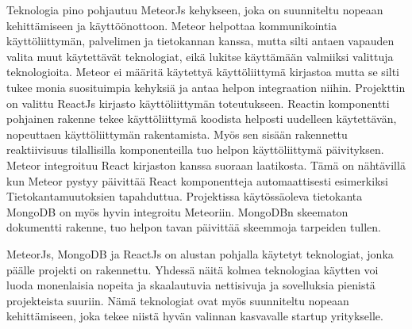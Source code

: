 \documentclass[11pt,a4paper,titlepage,oneside]{article}
\begin{document}
Teknologia pino pohjautuu MeteorJs kehykseen, joka on suunniteltu nopeaan kehittämiseen ja käyttöönottoon.
Meteor helpottaa kommunikointia käyttöliittymän, palvelimen ja tietokannan kanssa, 
mutta silti antaen vapauden valita muut käytettävät teknologiat, eikä lukitse käyttämään valmiiksi valittuja teknologioita.
Meteor ei määritä käytettyä käyttöliittymä kirjastoa mutta se silti tukee monia suosituimpia kehyksiä ja antaa helpon integraation niihin.
Projekttin on valittu ReactJs kirjasto käyttöliittymän toteutukseen.
Reactin komponentti pohjainen rakenne tekee käyttöliittymä koodista helposti uudelleen käytettävän, nopeuttaen käyttöliittymän rakentamista. 
Myös sen sisään rakennettu reaktiivisuus tilallisilla komponenteilla tuo helpon käyttöliittymä päivityksen.
Meteor integroituu React kirjaston kanssa suoraan laatikosta.
Tämä on nähtävillä kun Meteor pystyy päivittää React komponentteja automaattisesti esimerkiksi Tietokantamuutoksien tapahduttua. 
Projektissa käytössäoleva tietokanta MongoDB on myös hyvin integroitu Meteoriin.
MongoDBn skeematon dokumentti rakenne, tuo helpon tavan päivittää skeemmoja tarpeiden tullen.
\medskip


MeteorJs, MongoDB ja ReactJs on alustan pohjalla käytetyt teknologiat, jonka päälle projekti on rakennettu.
Yhdessä näitä kolmea teknologiaa käytten voi luoda monenlaisia nopeita ja skaalautuvia nettisivuja ja sovelluksia pienistä projekteista suuriin.
Nämä teknologiat ovat myös suunniteltu nopeaan kehittämiseen, joka tekee niistä hyvän valinnan kasvavalle startup yritykselle.
\medskip









\newpage
{}                %




\newpage
{}%






\newpage
{}        %
\end{document}
